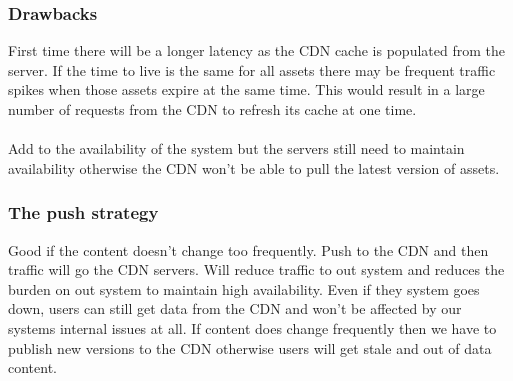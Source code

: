 \subsubsection{Drawbacks}
First time there will be a longer latency as the CDN cache is populated from the server.
If the time to live is the same for all assets there may be frequent traffic spikes when those assets expire at the same time.
This would result in a large number of requests from the CDN to refresh its cache at one time.

\paragraph{}
Add to the availability of the system but the servers still need to maintain availability otherwise the CDN won't be able to pull the latest version of assets.

\subsubsection{The push strategy}
Good if the content doesn't change too frequently.
Push to the CDN and then traffic will go the CDN servers.
Will reduce traffic to out system and reduces the burden on out system to maintain high availability.
Even if they system goes down, users can still get data from the CDN and won't be affected by our systems internal issues at all.
If content does change frequently then we have to publish new versions to the CDN otherwise users will get stale and out of data content.